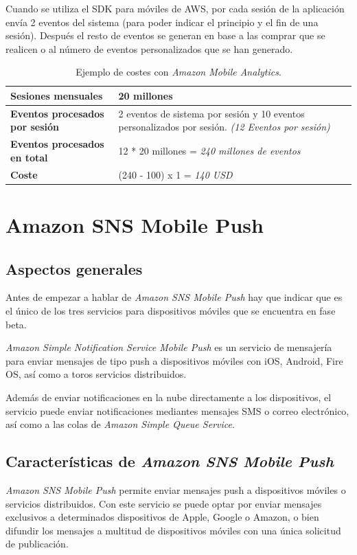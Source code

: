 \documentclass{article}
\begin{document}
	Cuando se utiliza el SDK para móviles de AWS, por cada sesión de la aplicación envía 2 eventos del sistema (para poder indicar el principio y el fin de una sesión). Después el resto de eventos se generan en base a las comprar que se realicen o al número de eventos personalizados que se han generado.

\begin{table}[h]
	\begin{center}
		\caption{Ejemplo de costes con \emph{Amazon Mobile Analytics}.}
		\begin{tabular}{|l|p{5cm}|}
\hline
\textbf{Sesiones mensuales} & 20 millones \\ \hline
\textbf{Eventos procesados por sesión} & 2 eventos de sistema por sesión y 10 eventos personalizados por sesión. \textit{(12 Eventos por sesión)}\\ \hline
\textbf{Eventos procesados en total} & 12 * 20 millones = \textit{240 millones de eventos} \\ \hline
\textbf{\color{red} Coste} & (240 - 100) x 1 = \textit{\color{red} 140 USD} \\ \hline
		\end{tabular}
		\label{tab:PrizeAmazonMobileAnalytics}
	\end{center}
\end{table}

\section{Amazon SNS Mobile Push}

\subsection{Aspectos generales}
	Antes de empezar a hablar de \emph{Amazon SNS Mobile Push} hay que indicar que es el único de los tres servicios para dispositivos móviles que se encuentra en fase beta.
	
	\emph{Amazon Simple Notification Service Mobile Push} es un servicio de mensajería para enviar mensajes de tipo push a dispositivos móviles con iOS, Android, Fire OS, así como a toros servicios distribuidos.
	
	Además de enviar notificaciones en la nube directamente a los dispositivos, el servicio puede enviar notificaciones mediantes mensajes SMS o correo electrónico, así como a las colas de \emph{Amazon Simple Queue Service}\cite{SQS}.

\subsection{Características de \emph{Amazon SNS Mobile Push}}
	\emph{Amazon SNS Mobile Push} permite enviar mensajes push a dispositivos móviles o servicios distribuidos. Con este servicio se puede optar por enviar mensajes exclusivos a determinados dispositivos de Apple, Google o Amazon, o bien difundir los mensajes a multitud de dispositivos móviles con una única solicitud de publicación.
	
\end{document}
